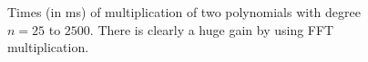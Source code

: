 \begin{figure}
\begin{minipage}[b]{.5\linewidth}
    \label{fig:polymul-fft}
  \end{minipage}%
  \caption{Times (in ms) of multiplication of two polynomials with degree $n
  = 25$ to $2500$. There is clearly a huge gain by using FFT multiplication.}
  \label{fig:polymul}
\end{figure}
